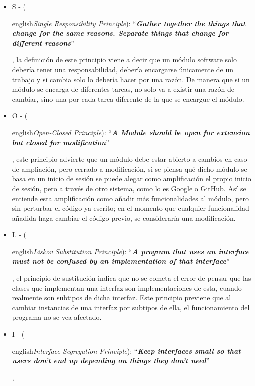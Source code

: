 \begin{itemize}
    \item S - (\begin{otherlanguage} {english}\textit{Single Responsibility Principle}):  ``\textit{\textbf{Gather together the things that change for the same reasons. Separate things that change for different reasons}}''\end{otherlanguage},
    la definición de este principio viene a decir que un módulo software solo debería tener una responsabilidad, 
    debería encargarse únicamente de un trabajo y si cambia solo lo debería hacer por una razón. De manera que si un 
    módulo se encarga de diferentes tareas, no solo va a existir una razón de cambiar, sino una por cada tarea 
    diferente de la que se encargue el módulo. 
    \item O - (\begin{otherlanguage} {english}\textit{Open-Closed Principle}): ``\textit{\textbf{A Module should be open for extension but closed for modification}}''\end{otherlanguage},
    este principio advierte que un módulo debe estar abierto a cambios en caso de ampliación, pero cerrado a 
    modificación, si se piensa qué dicho módulo se basa en un inicio de sesión se puede alegar como amplificación el 
    propio inicio de sesión, pero a través de otro sistema, como lo es Google o GitHub. Así se entiende esta 
    amplificación como añadir más funcionalidades al módulo, pero sin perturbar el código ya escrito; en el momento 
    que cualquier funcionalidad añadida haga cambiar el código previo, se consideraría una modificación.
    \item L - (\begin{otherlanguage} {english}\textit{Liskov Substitution Principle}):
    ``\textit{\textbf{A program that uses an interface must not be confused by an implementation of that interface}}''\end{otherlanguage},
    el principio de sustitución indica que no se cometa el error de pensar que las clases que implementan una interfaz
    son implementaciones de esta, cuando realmente son subtipos de dicha interfaz. Este principio previene que al 
    cambiar instancias de una interfaz por subtipos de ella, el funcionamiento del programa no se vea afectado.
    \item I - (\begin{otherlanguage} {english}\textit{Interface Segregation Principle}):
    ``\textit{\textbf{Keep interfaces small so that users don’t end up depending on things they don’t need}}''\end{otherlanguage},

\end{itemize}
